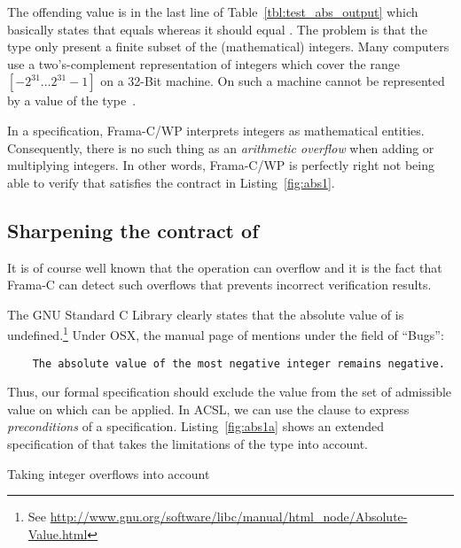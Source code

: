 The offending value is in the last line of Table~\ref{tbl:test_abs_output}
which basically states that  equals 
whereas it should equal .
The problem is that the type  only present a 
finite subset of the (mathematical) integers.
Many computers use a two's-complement representation of integers
which cover the range $[-2^{31}\ldots 2^{31}-1]$ on a 32-Bit machine.
On such a machine  cannot be  represented by a value
of the type~.

In a specification, Frama-C\slash WP interprets integers as mathematical entities.
Consequently, there is no such thing as an \emph{arithmetic overflow} when adding or multiplying
integers.
In other words,
Frama-C\slash WP is perfectly right not being able to verify that 
satisfies the contract in Listing~\ref{fig:abs1}.

\subsection{Sharpening the contract of }

It is of course well known that the operation  can overflow
and it is the fact that Frama-C can detect such overflows that 
prevents incorrect verification results.

The GNU Standard C Library clearly states that the absolute value of
 is undefined.\footnote{%
  See \url{http://www.gnu.org/software/libc/manual/html_node/Absolute-Value.html}
}
Under \textsf{OSX}, the manual page of  mentions under the field of ``Bugs'':
%
\begin{small}
\begin{verbatim}
    The absolute value of the most negative integer remains negative.
\end{verbatim}
\end{small}

Thus, our formal specification should exclude the value 
from the set of admissible value on which  can be applied.
In ACSL, we can use the  clause to express \emph{preconditions}
of a specification.
Listing~\ref{fig:abs1a} shows an extended specification of 
that takes the limitations of the type  into account.

\begin{listing}[hbt]
\begin{minipage}{\textwidth}

\end{minipage}
\caption{\label{fig:abs1a} Taking integer overflows into account}
\end{listing}

